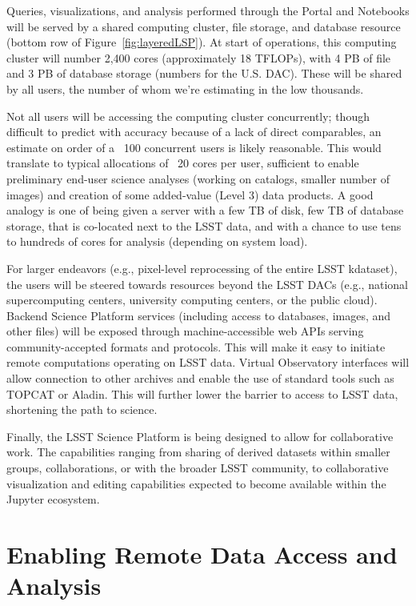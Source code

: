 \documentclass[DM,lsstdraft,toc]{lsstdoc}
\begin{document}
Queries, visualizations, and analysis performed through the Portal and
Notebooks will be served by a shared computing cluster, file storage, and
database resource (bottom row of Figure~\ref{fig:layeredLSP}).  At start of operations,
this computing cluster will number 2,400 cores (approximately 18 TFLOPs),
with 4 PB of file and 3 PB of database storage (numbers for the U.S.  DAC). 
These will be shared by all users, the number of whom we’re estimating in
the low thousands.

Not all users will be accessing the computing cluster concurrently; though
difficult to predict with accuracy because of a lack of direct comparables,
an estimate on order of a ~100 concurrent users is likely reasonable.  This
would translate to typical allocations of ~20 cores per user, sufficient to
enable preliminary end-user science analyses (working on catalogs, smaller
number of images) and creation of some added-value (Level 3) data products. 
A good analogy is one of being given a server with a few TB of disk, few TB
of database storage, that is co-located next to the LSST data, and with a
chance to use tens to hundreds of cores for analysis (depending on system
load).

For larger endeavors (e.g., pixel-level reprocessing of the entire LSST
kdataset), the users will be steered towards resources beyond the LSST DACs
(e.g., national supercomputing centers, university computing centers, or the
public cloud).  Backend Science Platform services (including access to
databases, images, and other files) will be exposed through
machine-accessible web APIs serving community-accepted formats and
protocols.  This will make it easy to initiate remote computations operating
on LSST data.  Virtual Observatory interfaces will allow connection to other
archives and enable the use of standard tools such as TOPCAT or Aladin. 
This will further lower the barrier to access to LSST data, shortening the
path to science.

Finally, the LSST Science Platform is being designed to allow for
collaborative work.  The capabilities ranging from sharing of derived
datasets within smaller groups, collaborations, or with the broader LSST
community, to collaborative visualization and editing capabilities expected
to become available within the Jupyter ecosystem.

\section{Enabling Remote Data Access and Analysis}
\end{document}
